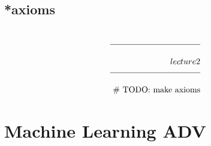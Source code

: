 \documentclass[a4paper]{article}
\newcommand{\eqComment}[1]{\text{  \# #1}}
\newcommand{\n}{\\[1.5ex] \hline \nonumber \\[0ex]}
\begin{document}
\subsection{*axioms}
\begin{tcolorbox}
\begin{align}
\n lecture 2
\n \eqComment{TODO: make axioms}
\end{align}
\end{tcolorbox}


\section{Machine Learning ADV}
\end{document}
